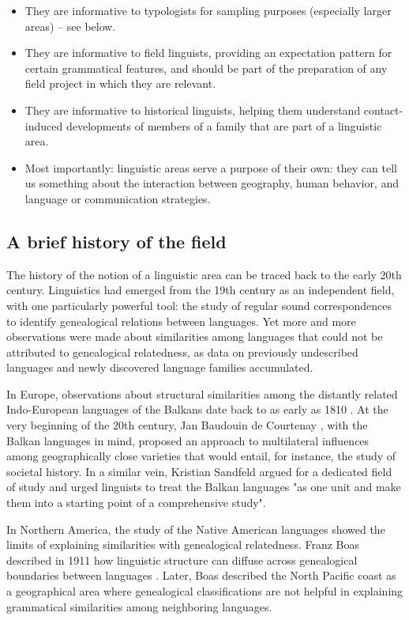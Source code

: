 \documentclass[output=paper,
modfonts
]{langscibook}
\begin{document}
\begin{itemize}
\setlength{\itemsep}{0.0\baselineskip}
\item They are informative to typologists for sampling purposes (especially larger areas) -- see below.
\item They are informative to field linguists, providing an expectation pattern for certain grammatical features, and should be part of the preparation of any field project in which they are relevant.
\item They are informative to historical linguists, helping them understand contact-induced developments of members of a family that are part of a linguistic area.
\item Most importantly: linguistic areas serve a purpose of their own: they can tell us something about the interaction between geography, human behavior, and language or communication strategies.
\end{itemize}

\subsection{A brief history of the field}
\label{subsec:history}

The history of the notion of a linguistic area can be traced back to the early 20th century. Linguistics had emerged from the 19th century as an independent field, with one particularly powerful tool: the study of regular sound correspondences to identify genealogical relations between languages. Yet more and more observations were made about similarities among languages that could not be attributed to genealogical relatedness, as data on previously undescribed languages and newly discovered language families accumulated.

In Europe, observations about structural similarities among the distantly related Indo-European languages of the Balkans date back to as early as 1810 \parencite[177]{friedman11}. At the very beginning of the 20th century, Jan Baudouin de Courtenay \parencite{boduen-de-kurtene1901}, with the Balkan languages in mind, proposed an approach to multilateral influences among geographically close varieties that would entail, for instance, the study of societal history. In a similar vein, Kristian Sandfeld \parencite*[8]{sandfeld26} argued for a dedicated field of study and urged linguists to treat the Balkan languages "as one unit and make them into a starting point of a comprehensive study".

In Northern America, the study of the Native American languages showed the limits of explaining similarities with genealogical relatedness. Franz Boas described in 1911 how linguistic structure can diffuse across genealogical boundaries between languages \parencite[47--53]{boas11}. Later, Boas \parencite*[6]{boas29} described the North Pacific coast as a geographical area where genealogical classifications are not helpful in explaining grammatical similarities among neighboring languages.
\end{document}
